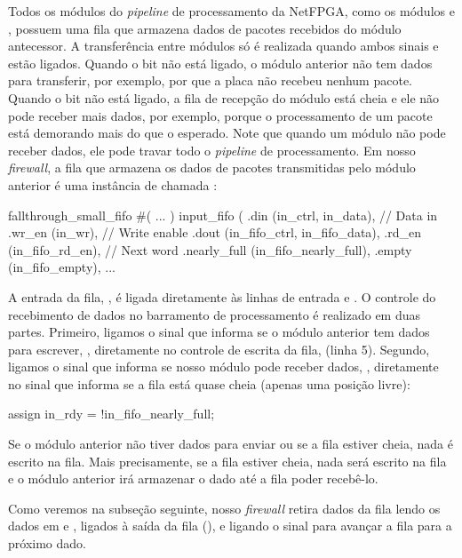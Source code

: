 Todos os módulos do \emph{pipeline} de processamento da NetFPGA, como os
módulos  e , possuem uma
fila que armazena dados de pacotes recebidos do módulo antecessor.  A
transferência entre módulos só é realizada quando ambos sinais 
e  estão ligados.  Quando o bit  não está ligado, o
módulo anterior não tem dados para transferir, por exemplo, por que a
placa não recebeu nenhum pacote.  Quando o bit  não está
ligado, a fila de recepção do módulo está cheia e ele não pode receber
mais dados, por exemplo, porque o processamento de um pacote está
demorando mais do que o esperado.  Note que quando um módulo não pode
receber dados, ele pode travar todo o \emph{pipeline} de processamento.
Em nosso \emph{firewall}, a fila que armazena os dados de pacotes
transmitidas pelo módulo anterior é uma instância de
 chamada :

\begin{verilogcode}
   fallthrough_small_fifo #(
      ...
   ) input_fifo (
      .din           ({in_ctrl, in_data}), // Data in
      .wr_en         (in_wr),              // Write enable
      .dout          ({in_fifo_ctrl, in_fifo_data}),
      .rd_en         (in_fifo_rd_en),      // Next word
      .nearly_full   (in_fifo_nearly_full),
      .empty         (in_fifo_empty),
      ...
\end{verilogcode}

A entrada da fila, , é ligada diretamente às linhas de entrada
 e .  O controle do recebimento de dados no
barramento de processamento é realizado em duas partes.  Primeiro,
ligamos o sinal que informa se o módulo anterior tem dados para
escrever, , diretamente no controle de escrita da fila,
 (linha 5).  Segundo, ligamos o sinal que informa se nosso
módulo pode receber dados, , diretamente no sinal que
informa se a fila está quase cheia (apenas uma posição livre):

\begin{verilogcode}
      assign in_rdy = !in_fifo_nearly_full;
\end{verilogcode}

Se o módulo anterior não tiver dados para enviar ou se a fila estiver
cheia, nada é escrito na fila.  Mais precisamente, se a fila estiver
cheia, nada será escrito na fila e o módulo anterior irá armazenar o
dado até a fila poder recebê-lo.

Como veremos na subseção seguinte, nosso \emph{firewall} retira dados da
fila lendo os dados em  e ,
ligados à saída da fila (), e ligando o sinal
 para avançar a fila para a próximo dado.


